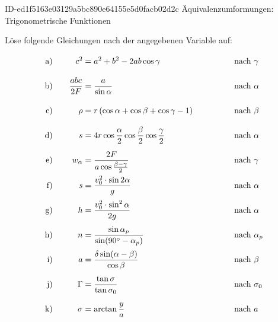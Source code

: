 \begin{exercise}
      {ID-ed1f5163e03129a5bc890e64155e5d0facb02d2c}
      {Äquivalenzumformungen: Trigonometrische Funktionen}
  \ifproblem\problem\par
    \newcommand{\exnum}[1]{\text{\rule[-2.5ex]{0pt}{6ex}#1}}
    Löse folgende Gleichungen nach der angegebenen Variable auf:
    \allowdisplaybreaks
    \begin{alignat*}{4}
      \exnum{a)}&\quad &          c^{2}&=a^{2}+b^{2}-2ab\cos\gamma                                                  & \quad&\quad & \quad&\text{nach $\gamma$}     \\
      \exnum{b)}&\quad & \frac{abc}{2F}&=\frac{a}{\sin\alpha}                                                       & \quad&\quad & \quad&\text{nach $\alpha$}     \\
      \exnum{c)}&\quad &           \rho&=r\left(\cos\alpha+\cos\beta+\cos\gamma-1\right)                            & \quad&\quad & \quad&\text{nach $\beta$}      \\
      \exnum{d)}&\quad &              s&=4r\cos\frac{\alpha}{2}\cos\frac{\beta}{2}\cos\frac{\gamma}{2}              & \quad&\quad & \quad&\text{nach $\alpha$}     \\
      \exnum{e)}&\quad &              w_{\alpha}&=\frac{2F}{a\cos\frac{\beta-\gamma}{2}}                            & \quad&\quad & \quad&\text{nach $\gamma$}     \\
      \exnum{f)}&\quad &              s&=\frac{v_{0}^{2}\cdot\sin2\alpha}{g}                                        & \quad&\quad & \quad&\text{nach $\alpha$}     \\
      \exnum{g)}&\quad &              h&=\frac{v_{0}^{2}\cdot\sin^{2}\alpha}{2g}                                    & \quad&\quad & \quad&\text{nach $\alpha$}     \\
      \exnum{h)}&\quad &              n&=\frac{\sin\alpha_{p}}{\sin(90^{\circ}-\alpha_{p})}                         & \quad&\quad & \quad&\text{nach $\alpha_{p}$} \\
      \exnum{i)}&\quad &              a&=\frac{\delta\sin(\alpha-\beta)}{\cos\beta}                                 & \quad&\quad & \quad&\text{nach $\beta$}      \\
      \exnum{j)}&\quad &        \Gamma&=\frac{\tan\sigma}{\tan\sigma_{0}}                                           & \quad&\quad & \quad&\text{nach $\sigma_{0}$} \\
      \exnum{k)}&\quad &        \sigma&=\arctan\frac{y}{a}                                                          & \quad&\quad & \quad&\text{nach $a$}          \\

\end{alignat*}
\end{exercise}
